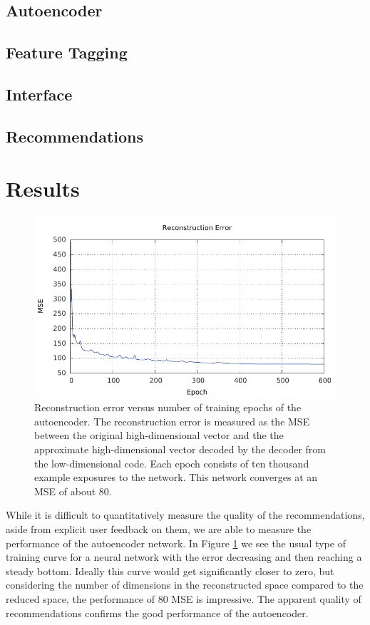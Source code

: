 \documentclass[conference]{IEEEtran}
\begin{document}
\subsection{Autoencoder}

\subsection{Feature Tagging}

\subsection{Interface}

\subsection{Recommendations}


\section{Results} \begin{figure} \centering
\includegraphics[width=\linewidth]{error.pdf} 
\caption{ Reconstruction error versus number of training epochs of the
autoencoder. The reconstruction error is measured as the MSE between the
original high-dimensional vector and the the approximate high-dimensional
vector decoded by the decoder from the low-dimensional code. Each epoch
consists of ten thousand example exposures to the network. This network
converges at an MSE of about 80.}
\label{error} 
\end{figure}

While it is difficult to quantitatively measure the quality of the
recommendations, aside from explicit user feedback on them, we are able to
measure the performance of the autoencoder network. In Figure \ref{error} we
see the usual type of training curve for a neural network with the error
decreasing and then reaching a steady bottom. Ideally this curve would get
significantly closer to zero, but considering the number of dimensions in the
reconstructed space compared to the reduced space, the performance of 80 MSE
is impressive. The apparent quality of recommendations confirms the good
performance of the autoencoder.
\end{document}
